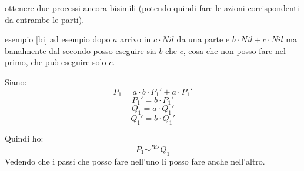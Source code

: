 \documentclass[a4paper,12pt, oneside]{book}
\begin{document}
ottenere due processi ancora bisimili (potendo quindi fare le azioni
corrispondenti da entrambe le parti).
\begin{esempio}
  esempio \ref{bi} ad esempio dopo $a$ arrivo in $c\cdot Nil$ da una parte e
  $b\cdot Nil+ c\cdot Nil$ ma banalmente dal secondo posso eseguire sia $b$ che
  $c$, cosa che non posso fare nel primo, che può eseguire solo $c$.
\end{esempio}
\begin{esempio}
  Siano:
  \[P_1=a\cdot b\cdot P_1'+a\cdot P_1'\]
  \[P_1'=b\cdot P_1'\]
  \[Q_1=a\cdot Q_1'\]
  \[Q_1'=b\cdot Q_1'\]
  \begin{center}
  \end{center}
  \begin{center}
  \end{center}
  Quindi ho:
  \[P_1\sim^{Bis}Q_1\]
  Vedendo che i passi che posso fare nell'uno li posso fare anche
  nell'altro.
\end{esempio}
\end{document}
